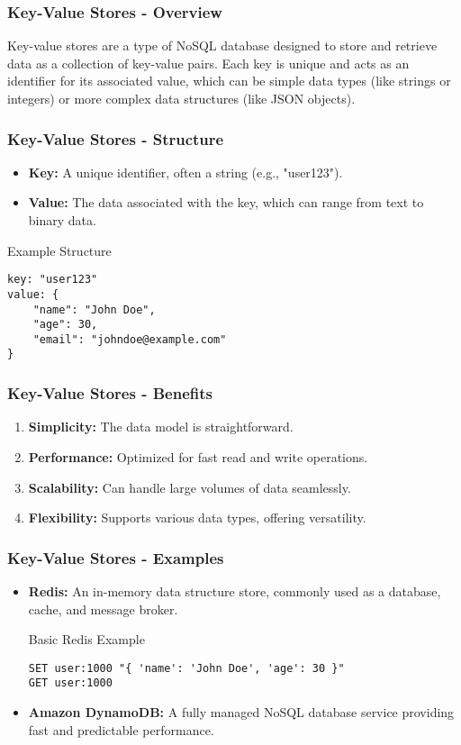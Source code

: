 \documentclass[aspectratio=169]{beamer}
\begin{document}
\begin{frame}[fragile]
    \frametitle{Key-Value Stores - Overview}
    Key-value stores are a type of NoSQL database designed to store and retrieve data as a collection of key-value pairs. Each key is unique and acts as an identifier for its associated value, which can be simple data types (like strings or integers) or more complex data structures (like JSON objects).
\end{frame}

\begin{frame}[fragile]
    \frametitle{Key-Value Stores - Structure}
    \begin{itemize}
        \item \textbf{Key:} A unique identifier, often a string (e.g., "user123").
        \item \textbf{Value:} The data associated with the key, which can range from text to binary data.
    \end{itemize}

    \begin{block}{Example Structure}
        \begin{verbatim}
key: "user123"
value: {
    "name": "John Doe",
    "age": 30,
    "email": "johndoe@example.com"
}
        \end{verbatim}
    \end{block}
\end{frame}

\begin{frame}[fragile]
    \frametitle{Key-Value Stores - Benefits}    
    \begin{enumerate}
        \item \textbf{Simplicity:} The data model is straightforward.
        \item \textbf{Performance:} Optimized for fast read and write operations.
        \item \textbf{Scalability:} Can handle large volumes of data seamlessly.
        \item \textbf{Flexibility:} Supports various data types, offering versatility.
    \end{enumerate}
\end{frame}

\begin{frame}[fragile]
    \frametitle{Key-Value Stores - Examples}
    \begin{itemize}
        \item \textbf{Redis:} 
        An in-memory data structure store, commonly used as a database, cache, and message broker.
        \begin{block}{Basic Redis Example}
        \begin{verbatim}
SET user:1000 "{ 'name': 'John Doe', 'age': 30 }"
GET user:1000
        \end{verbatim}
        \end{block}

        \item \textbf{Amazon DynamoDB:} 
        A fully managed NoSQL database service providing fast and predictable performance.
    \end{itemize}
\end{frame}
\end{document}
